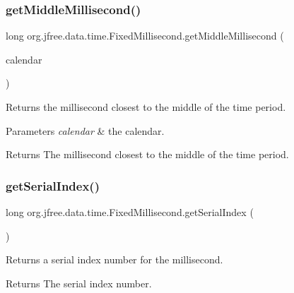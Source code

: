 \subsubsection{\texorpdfstring{get\+Middle\+Millisecond()}{getMiddleMillisecond()}\hspace{0.1cm}{\footnotesize\ttfamily [2/2]}}
{\footnotesize\ttfamily long org.\+jfree.\+data.\+time.\+Fixed\+Millisecond.\+get\+Middle\+Millisecond (\begin{DoxyParamCaption}\item[{Calendar}]{calendar }\end{DoxyParamCaption})}

Returns the millisecond closest to the middle of the time period.


\begin{DoxyParams}{Parameters}
{\em calendar} & the calendar.\\
\hline
\end{DoxyParams}
\begin{DoxyReturn}{Returns}
The millisecond closest to the middle of the time period. 
\end{DoxyReturn}
\mbox{\label{classorg_1_1jfree_1_1data_1_1time_1_1_fixed_millisecond_a707613a6cec428d9ef7b772bd8078bcd}} 
\subsubsection{\texorpdfstring{get\+Serial\+Index()}{getSerialIndex()}}
{\footnotesize\ttfamily long org.\+jfree.\+data.\+time.\+Fixed\+Millisecond.\+get\+Serial\+Index (\begin{DoxyParamCaption}{ }\end{DoxyParamCaption})}

Returns a serial index number for the millisecond.

\begin{DoxyReturn}{Returns}
The serial index number. 
\end{DoxyReturn}
\mbox{\label{classorg_1_1jfree_1_1data_1_1time_1_1_fixed_millisecond_ab90c14e18854d7d1ea40db4fa6e84e42}} 
